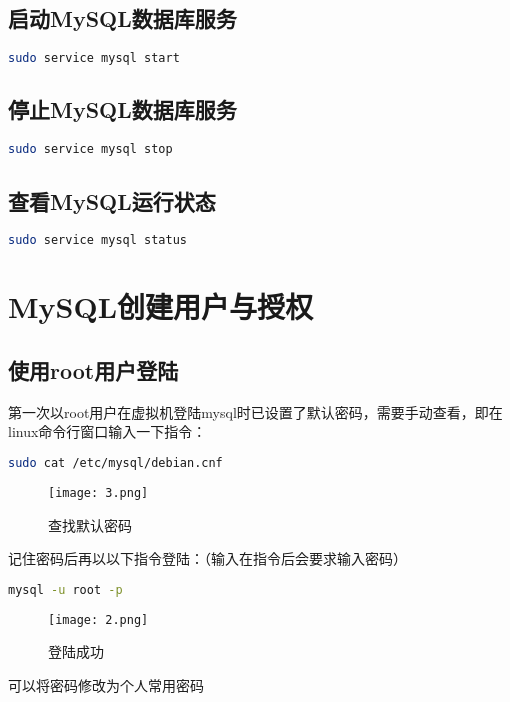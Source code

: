 \documentclass[12pt]{article}
\begin{document}
\subsection{启动MySQL数据库服务}

\begin{lstlisting}[language=Bash]
        sudo service mysql start
\end{lstlisting}
\subsection{停止MySQL数据库服务}
\begin{lstlisting}[language=Bash]
        sudo service mysql stop
\end{lstlisting}
\subsection{查看MySQL运行状态}
\begin{lstlisting}[language=Bash]
        sudo service mysql status
\end{lstlisting}

\section{MySQL创建用户与授权}
\subsection{使用root用户登陆}
{\songti 第一次以root用户在虚拟机登陆mysql时已设置了默认密码，需要手动查看，即在linux命令行窗口输入一下指令：}
\begin{lstlisting}[language=Bash]
        sudo cat /etc/mysql/debian.cnf
\end{lstlisting}
\begin{figure}[htbp]
    \centering
    \texttt{[image: 3.png]}
    \caption{查找默认密码}
    \label{fig:enter-label}
\end{figure}

{\songti 记住密码后再以以下指令登陆：（输入在指令后会要求输入密码）}
\begin{lstlisting}[language=Bash]
        mysql -u root -p
\end{lstlisting}

\begin{figure}[htbp]
        \centering
        \texttt{[image: 2.png]}
        \caption{登陆成功}
        \label{fig:enter-label}
\end{figure}
{\songti 可以将密码修改为个人常用密码}
\end{document}
